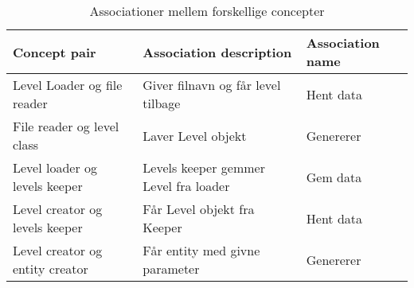 \begin{table}[]
\centering
\begin{tabular}{|l|l|l|}
\hline
\textbf{Concept pair}           & \textbf{Association description}      & \textbf{Association name} \\ \hline
Level Loader og file reader     & Giver filnavn og får level tilbage    & Hent data                 \\ \hline
File reader og level class      & Laver Level objekt                    & Genererer                 \\ \hline
Level loader og levels keeper   & Levels keeper gemmer Level fra loader & Gem data                  \\ \hline
Level creator og levels keeper  & Får Level objekt fra Keeper           & Hent data                 \\ \hline
Level creator og entity creator & Får entity med givne parameter        & Genererer                 \\ \hline
\end{tabular}
\caption{Associationer mellem forskellige concepter}
\label{associations}
\end{table}


